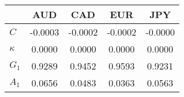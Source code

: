\begin{normalsize}\begin{tabular}{|l|c|c|c|c|}
\hline
&\textbf{AUD}&\textbf{CAD}&\textbf{EUR}&\textbf{JPY}\\\hline
\textbf{$C$}&-0.0003&-0.0002&-0.0002&-0.0000\\\hline
\textbf{$\kappa$}&0.0000&0.0000&0.0000&0.0000\\\hline
\textbf{$G_1$}&0.9289&0.9452&0.9593&0.9231\\\hline
\textbf{$A_1$}&0.0656&0.0483&0.0363&0.0563\\\hline
\end{tabular}
\end{normalsize}